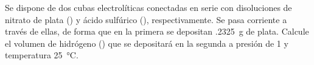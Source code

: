 Se dispone de dos cubas electrolíticas conectadas en serie con disoluciones de nitrato de plata () y ácido sulfúrico (), respectivamente. Se pasa corriente a través de ellas, de forma que en la primera se depositan \SI{,2325}{\gram} de plata. Calcule el volumen de hidrógeno () que se depositará en la segunda a presión de \SI{1}{\atm} y temperatura \SI{25}{\celsius}.
